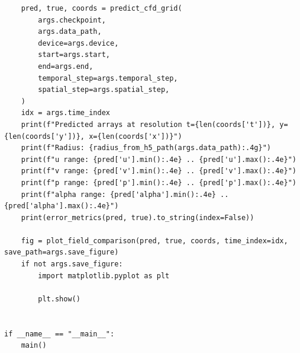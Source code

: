 \begin{lstlisting}
    pred, true, coords = predict_cfd_grid(
        args.checkpoint,
        args.data_path,
        device=args.device,
        start=args.start,
        end=args.end,
        temporal_step=args.temporal_step,
        spatial_step=args.spatial_step,
    )
    idx = args.time_index
    print(f"Predicted arrays at resolution t={len(coords['t'])}, y={len(coords['y'])}, x={len(coords['x'])}")
    print(f"Radius: {radius_from_h5_path(args.data_path):.4g}")
    print(f"u range: {pred['u'].min():.4e} .. {pred['u'].max():.4e}")
    print(f"v range: {pred['v'].min():.4e} .. {pred['v'].max():.4e}")
    print(f"p range: {pred['p'].min():.4e} .. {pred['p'].max():.4e}")
    print(f"alpha range: {pred['alpha'].min():.4e} .. {pred['alpha'].max():.4e}")
    print(error_metrics(pred, true).to_string(index=False))

    fig = plot_field_comparison(pred, true, coords, time_index=idx, save_path=args.save_figure)
    if not args.save_figure:
        import matplotlib.pyplot as plt

        plt.show()


if __name__ == "__main__":
    main()
\end{lstlisting}

